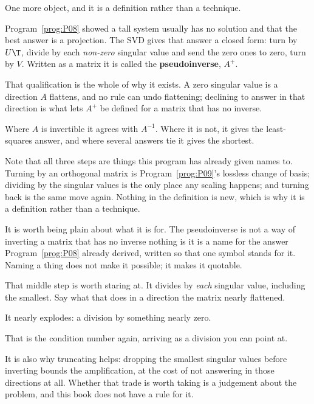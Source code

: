 \begin{fr}
One more object, and it is a definition rather than a technique.

Program~\ref{prog:P08} showed a tall system usually has no solution and that
the best answer is a projection. The SVD gives that answer a closed form: turn
by $U\T$, divide by each \emph{non-zero} singular value and send the zero ones
to zero, turn by $V$. Written as a matrix it is called the
\textbf{pseudoinverse}, $A^{+}$.

That qualification is the whole of why it exists. A zero singular value is a
direction $A$ flattens, and no rule can undo flattening; declining to answer in
that direction is what lets $A^{+}$ be defined for a matrix that has no
inverse.

Where $A$ is invertible it agrees with $A^{-1}$. Where it is not, it gives the
least-squares answer, and where several answers tie it gives the shortest.

Note that all three steps are things this program has already given names to.
Turning by an orthogonal matrix is Program~\ref{prog:P09}'s lossless change of
basis; dividing by the singular values is the only place any scaling happens;
and turning back is the same move again. Nothing in the definition is new,
which is why it is a definition rather than a technique.

It is worth being plain about what it is for. The pseudoinverse is not a way
of inverting a matrix that has no inverse \dash{} nothing is \dash{} it is a
name for the answer Program~\ref{prog:P08} already derived, written so that
one symbol stands for it. Naming a thing does not make it possible; it makes
it quotable.

That middle step is worth staring at. It divides by \emph{each} singular value,
including the smallest. Say what that does in a direction the matrix nearly
flattened.
\dotline
\nextframe
\end{fr}

\begin{fr}
\begin{ansblock}
It nearly explodes: a division by something nearly zero.
\end{ansblock}

That is the condition number again, arriving as a division you can point at.

It is also why truncating helps: dropping the smallest singular values before
inverting bounds the amplification, at the cost of not answering in those
directions at all. Whether that trade is worth taking is a judgement about the
problem, and this book does not have a rule for it.
\end{fr}

